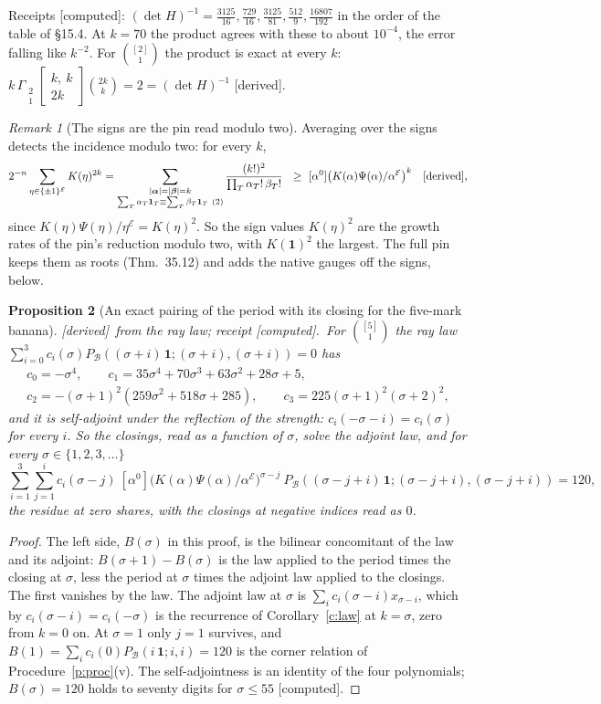 \documentclass[11pt]{article}
\newcommand{\cE}{\mathcal E}
\newcommand{\cB}{\mathcal B}
\newcommand{\one}{\mathbf 1}
\newcommand{\Gst}[4]{\Gamma_{\substack{#1\\#2}}\!\begin{bmatrix}#3\\#4\end{bmatrix}}
\newcommand{\Pc}[1]{P_{\cB}(#1\,\one;#1,#1)}
\newcommand{\Clo}[1]{[\alpha^0]\big(K(\alpha)\Psi(\alpha)/\alpha^{\cE}\big)^{#1}}
\theoremstyle{plain}
\newtheorem{proposition}{Proposition}[section]
\theoremstyle{definition}
\theoremstyle{remark}
\newtheorem{remark}[proposition]{Remark}
\newcommand{\derived}{\textup{[derived]}}
\newcommand{\computed}{\textup{[computed]}}
\begin{document}
\noindent Receipts \computed: $(\det H)^{-1}=\frac{3125}{16},\frac{729}{16},\frac{3125}{81},\frac{512}9,\frac{16807}{192}$ in the order of the table of \S15.4. At $k=70$ the product agrees with these to about $10^{-4}$, the error falling like $k^{-2}$. For $\binom{[2]}1$ the product is exact at every $k$: $k\,\Gst21{k,\ k}{2k}\binom{2k}k=2=(\det H)^{-1}$ \derived.

\begin{remark}[The signs are the pin read modulo two]
Averaging over the signs detects the incidence modulo two: for every $k$,
\[
2^{-n}\sum_{\eta\in\{\pm1\}^{\cE}}K(\eta)^{2k}=\sum_{\substack{|\boldsymbol\alpha|=|\boldsymbol\beta|=k\\ \sum_T\alpha_T\one_T\equiv\sum_T\beta_T\one_T\ (2)}}\frac{(k!)^2}{\prod_T\alpha_T!\,\beta_T!}\ \ \ge\ \Clo k\quad\derived,
\]
since $K(\eta)\Psi(\eta)/\eta^{\cE}=K(\eta)^2$. So the sign values $K(\eta)^2$ are the growth rates of the pin's reduction modulo two, with $K(\one)^2$ the largest. The full pin keeps them as roots (Thm.~35.12) and adds the native gauges off the signs, below.
\end{remark}

\begin{proposition}[An exact pairing of the period with its closing for the five-mark banana]\label{p:pairing}\derived\ from the ray law; receipt \computed.\ For $\binom{[5]}1$ the ray law $\sum_{i=0}^3c_i(\sigma)\Pc{(\sigma+i)}=0$ has
\begin{gather*}
c_0=-\sigma^4,\qquad c_1=35\sigma^4+70\sigma^3+63\sigma^2+28\sigma+5,\\
c_2=-(\sigma+1)^2(259\sigma^2+518\sigma+285),\qquad c_3=225(\sigma+1)^2(\sigma+2)^2,
\end{gather*}
and it is self-adjoint under the reflection of the strength: $c_i(-\sigma-i)=c_i(\sigma)$ for every $i$. So the closings, read as a function of $\sigma$, solve the adjoint law, and for every $\sigma\in\{1,2,3,\dots\}$
\[
\sum_{i=1}^3\sum_{j=1}^ic_i(\sigma-j)\ \Clo{\sigma-j}\ \Pc{(\sigma-j+i)}=120,
\]
the residue at zero shares, with the closings at negative indices read as $0$.
\end{proposition}

\begin{proof}
The left side, $B(\sigma)$ in this proof, is the bilinear concomitant of the law and its adjoint: $B(\sigma+1)-B(\sigma)$ is the law applied to the period times the closing at $\sigma$, less the period at $\sigma$ times the adjoint law applied to the closings. The first vanishes by the law. The adjoint law at $\sigma$ is $\sum_ic_i(\sigma-i)x_{\sigma-i}$, which by $c_i(\sigma-i)=c_i(-\sigma)$ is the recurrence of Corollary~\ref{c:law} at $k=\sigma$, zero from $k=0$ on. At $\sigma=1$ only $j=1$ survives, and $B(1)=\sum_ic_i(0)\Pc i=120$ is the corner relation of Procedure~\ref{p:proc}(v). The self-adjointness is an identity of the four polynomials; $B(\sigma)=120$ holds to seventy digits for $\sigma\le55$ \computed.
\end{proof}
\end{document}
